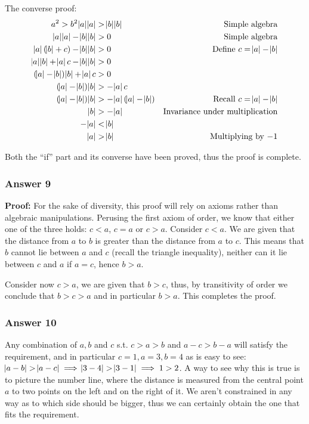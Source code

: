\documentclass[11pt]{article}
\begin{document}
The converse proof:
\begin{equation*}
  \begin{aligned}
    a^2 > b^2
    \abs{a}\abs{a} &> \abs{b}\abs{b} & \textrm{Simple algebra} \\
    \abs{a}\abs{a} - \abs{b}\abs{b} &> 0 & \textrm{Simple algebra} \\
    \abs{a}(\abs{b} + c) - \abs{b}\abs{b} &> 0 & \textrm{Define $c=\abs{a}-\abs{b}$} \\
    \abs{a}\abs{b} + \abs{a}c - \abs{b}\abs{b} &> 0 \\
    (\abs{a} - \abs{b})\abs{b} + \abs{a}c &> 0 \\
    (\abs{a} - \abs{b})\abs{b} &> -\abs{a}c \\
    (\abs{a} - \abs{b})\abs{b} &> -\abs{a}(\abs{a}-\abs{b})
    & \textrm{Recall $c=\abs{a}-\abs{b}$} \\
    \abs{b} &> -\abs{a} & \textrm{Invariance under multiplication} \\
    -\abs{a} &< \abs{b} \\
    \abs{a} &> \abs{b} & \textrm{Multiplying by $-1$}
  \end{aligned}
\end{equation*}

Both the ``if'' part and its converse have been proved, thus the proof is complete.
\subsubsection{Answer 9}
\label{sec-1-4-4}
\textbf{Proof:} For the sake of diversity, this proof will rely on axioms rather
than algebraic manipulations.  Perusing the first axiom of order, we know
that either one of the three holds: $c < a$, $c = a$ or $c > a$.  Consider
$c < a$.  We are given that the distance from $a$ to $b$ is greater than the
distance from $a$ to $c$.  This means that $b$ cannot lie between $a$ and
$c$ (recall the triangle inequality), neither can it lie between $c$ and $a$
if $a = c$, hence $b > a$.

Consider now $c > a$, we are given that $b > c$, thus, by transitivity of
order we conclude that $b > c > a$ and in particular $b > a$.  This
completes the proof.
\subsubsection{Answer 10}
\label{sec-1-4-5}
Any combination of $a, b$ and $c$ s.t. $c > a > b$ and $a - c > b - a$ will
satisfy the requirement, and in particular $c=1, a=3, b=4$ as is easy to
see: $\abs{a-b}>\abs{a-c}\implies\abs{3-4}>\abs{3-1}\implies 1 > 2$.
A way to see why this is true is to picture the number line, where
the distance is measured from the central point $a$ to two points on
the left and on the right of it.  We aren't constrained in any way as
to which side should be bigger, thus we can certainly obtain the one
that fits the requirement.
\end{document}
